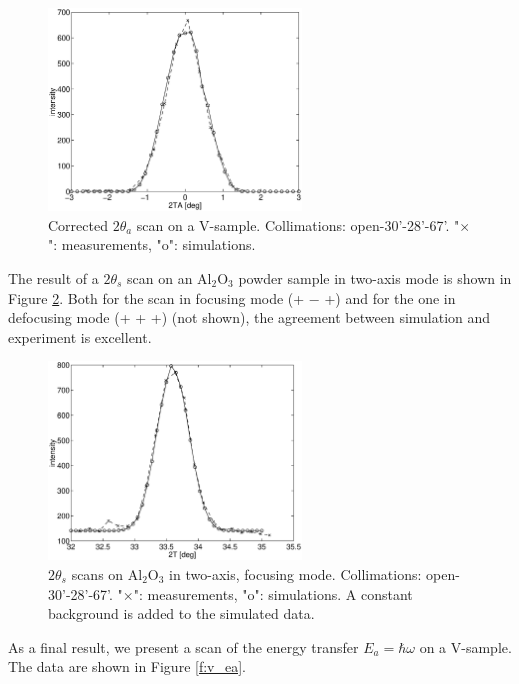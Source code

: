 \begin{figure}
  \begin{center}
    \includegraphics[width=0.6\textwidth]{figures/vanadium-plot-2.eps}
  \end{center}
\caption{Corrected $2\theta_a$ scan on a V-sample.
Collimations: open-30'-28'-67'.
"$\times$": measurements, "o": simulations.}
\label{f:v_2ta_zero}
\end{figure}

The result of a $2\theta_s$ scan on an Al$_2$O$_3$
powder sample in two-axis mode is shown in Figure \ref{f:al2o3}.
Both for the scan in focusing mode (+ $-$ +)
and for the one in defocusing mode (+ + +) (not shown),
the agreement between simulation and experiment is excellent.

\begin{figure}
  \begin{center}
    \includegraphics[width=0.6\textwidth]{figures/al2o3-focus.eps}
  \end{center}
\caption{$2\theta_s$ scans on Al$_2$O$_3$ in two-axis, focusing mode.
Collimations: open-30'-28'-67'.
"$\times$": measurements, "o": simulations.  
A constant background is added to the simulated data.}
\label{f:al2o3}
\end{figure}

As a final result, we present a scan of the energy
transfer $E_a = \hbar \omega$ on a V-sample.
The data are shown in Figure \ref{f:v_ea}.

